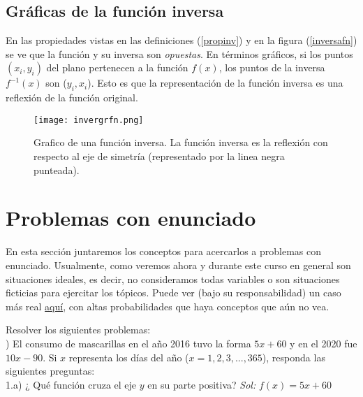 \subsection{Gráficas de la función inversa}
En las propiedades vistas en las definiciones (\ref{propinv}) y en la figura (\ref{inversafn}) se ve que la función y su inversa son \textit{opuestas}. En términos gráficos, si los puntos $(x_{i},y_{i})$ del plano pertenecen a la función $f(x)$, los puntos de la inversa $f^{-1}(x)$ son ($y_{i},x_{i}$). Esto es que la representación de la función inversa  es una reflexión de la función original. \\
 


\begin{center}
\begin{figure}[h!]
\centering
\texttt{[image: invergrfn.png]}
\caption[Grafico de una función inversa.]{Grafico de una función inversa. La función inversa es la reflexión con respecto al eje de simetría (representado por la linea negra punteada).} \label{Graficofnin}
\end{figure}
\end{center}

\section{Problemas con enunciado}
En esta sección juntaremos los conceptos para acercarlos a problemas con enunciado. Usualmente, como veremos ahora y durante este curso en general son situaciones ideales, es decir, no consideramos todas variables o son situaciones ficticias para ejercitar los tópicos. Puede ver (bajo su responsabilidad) un caso más real \href{https://www.ncbi.nlm.nih.gov/pmc/articles/PMC2499579/pdf/Nheartj00138-0006.pdf}{aquí}, con altas probabilidades que haya conceptos que aún no vea.

Resolver los siguientes problemas:\\

) El consumo de mascarillas en el año 2016 tuvo la forma $5x+60$ y en el 2020 fue $10x-90$. Si $x$ representa los días del año ($x=1,2,3,...,365$), responda las siguientes preguntas:\\

\noindent 1.a) ¿ Qué función cruza el eje $y$ en su parte positiva?
\noindent \textit{Sol:} $f(x)=5x+60$ \\


